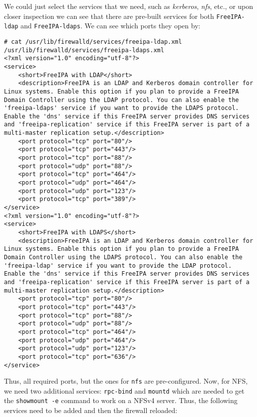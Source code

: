 \noindent
We could just select the services that we need, such as \textit{kerberos}, \textit{nfs}, etc., or upon closer inspection we can see that there are pre-built services for both \verb|FreeIPA-ldap| and \verb|FreeIPA-ldaps|. We can see which ports they open by: 

\vspace{-15pt}
\begin{verbatim}
# cat /usr/lib/firewalld/services/freeipa-ldap.xml /usr/lib/firewalld/services/freeipa-ldaps.xml 
<?xml version="1.0" encoding="utf-8"?>
<service>
	<short>FreeIPA with LDAP</short>
	<description>FreeIPA is an LDAP and Kerberos domain controller for Linux systems. Enable this option if you plan to provide a FreeIPA Domain Controller using the LDAP protocol. You can also enable the 'freeipa-ldaps' service if you want to provide the LDAPS protocol. Enable the 'dns' service if this FreeIPA server provides DNS services and 'freeipa-replication' service if this FreeIPA server is part of a multi-master replication setup.</description>
	<port protocol="tcp" port="80"/>
	<port protocol="tcp" port="443"/>
	<port protocol="tcp" port="88"/>
	<port protocol="udp" port="88"/>
	<port protocol="tcp" port="464"/>
	<port protocol="udp" port="464"/>
	<port protocol="udp" port="123"/>
	<port protocol="tcp" port="389"/>
</service>
<?xml version="1.0" encoding="utf-8"?>
<service>
	<short>FreeIPA with LDAPS</short>
	<description>FreeIPA is an LDAP and Kerberos domain controller for Linux systems. Enable this option if you plan to provide a FreeIPA Domain Controller using the LDAPS protocol. You can also enable the 'freeipa-ldap' service if you want to provide the LDAP protocol. Enable the 'dns' service if this FreeIPA server provides DNS services and 'freeipa-replication' service if this FreeIPA server is part of a multi-master replication setup.</description>
	<port protocol="tcp" port="80"/>
	<port protocol="tcp" port="443"/>
	<port protocol="tcp" port="88"/>
	<port protocol="udp" port="88"/>
	<port protocol="tcp" port="464"/>
	<port protocol="udp" port="464"/>
	<port protocol="udp" port="123"/>
	<port protocol="tcp" port="636"/>
</service>
\end{verbatim}
\vspace{-10pt}	

\noindent
Thus, all required ports, but the ones for \verb|nfs| are pre-configured. Now, for NFS, we need two additional services: \verb|rpc-bind| and \verb|mountd| which are needed to get the \verb|showmount -e| command to work on a NFSv4 server. Thus, the following services need to be added and then the firewall reloaded:

